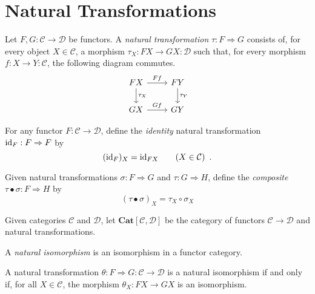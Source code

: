 \chapter{Natural Transformations}

\begin{df}
Let $F,G : \mathcal{C} \rightarrow \mathcal{D}$ be functors. A \emph{natural transformation} $\tau : F \Rightarrow G$ consists of, for every object $X \in \mathcal{C}$, a morphism $\tau_X : F X \rightarrow G X : \mathcal{D}$ such that, for every morphism $f : X \rightarrow Y : \mathcal{C}$, the following diagram commutes.
\[ \begin{tikzcd}
FX \arrow[r,"Ff"] \arrow[d,"\tau_X"] & FY \arrow[d,"\tau_Y"] \\
GX \arrow[r,"Gf"] & GY
\end{tikzcd} \]
\end{df}

\begin{df}
For any functor $F : \mathcal{C} \rightarrow \mathcal{D}$, define the \emph{identity} natural transformation $\mathrm{id}_{F} : F \Rightarrow F$ by
\[ (\mathrm{id}_{F})_X = \mathrm{id}_{FX} \qquad (X \in \mathcal{C}) \enspace . \]
\end{df}

\begin{df}
Given natural transformations $\sigma : F \Rightarrow G$ and $\tau : G \Rightarrow H$, define the \emph{composite} $\tau \bullet \sigma : F \Rightarrow H$ by
\[ (\tau \bullet \sigma)_X = \tau_X \circ \sigma_X \]
\end{df}

\begin{df}
Given categories $\mathcal{C}$ and $\mathcal{D}$, let $\mathbf{Cat}[\mathcal{C}, \mathcal{D}]$ be the category of functors $\mathcal{C} \rightarrow \mathcal{D}$ and natural transformations.
\end{df}

\begin{df}
A \emph{natural isomorphism} is an isomorphism in a functor category.
\end{df}

\begin{prop}
A natural transformation $\theta : F \Rightarrow G : \mathcal{C} \rightarrow \mathcal{D}$ is a natural isomorphism if and only if, for all $X \in \mathcal{C}$, the morphism $\theta_X : FX \rightarrow GX$ is an isomorphism.
\end{prop}

